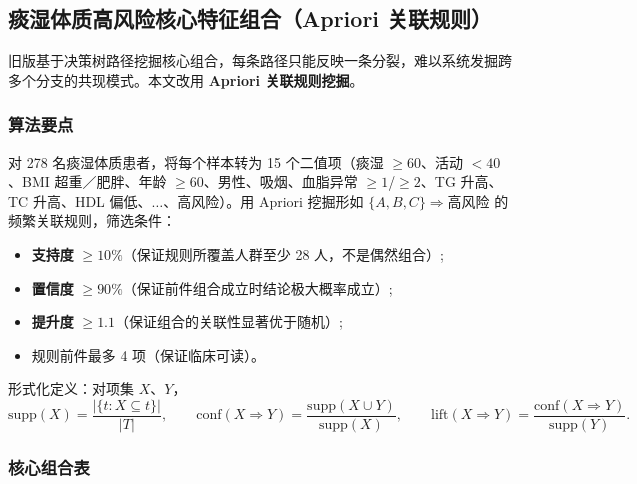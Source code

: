 \documentclass{MathorCupmodeling}
\providecommand{\tightlist}{%
  \setlength{\itemsep}{0pt}\setlength{\parskip}{0pt}}
\begin{document}
\subsection{痰湿体质高风险核心特征组合（Apriori 关联规则）}\label{sec:q2-apriori}

旧版基于决策树路径挖掘核心组合，每条路径只能反映一条分裂，难以系统发掘跨多个分支的共现模式。本文改用 \textbf{Apriori 关联规则挖掘}\cite{agrawal1994}。

\subsubsection{算法要点}

对 278 名痰湿体质患者，将每个样本转为 15 个二值项（痰湿 $\ge 60$、活动 $< 40$、BMI 超重／肥胖、年龄 $\ge 60$、男性、吸烟、血脂异常 $\ge 1$/$\ge 2$、TG 升高、TC 升高、HDL 偏低、$\ldots$、高风险）。用 Apriori 挖掘形如 $\{A, B, C\} \Rightarrow \text{高风险}$ 的频繁关联规则，筛选条件：

\begin{itemize}
\tightlist
\item \textbf{支持度} $\ge 10\%$（保证规则所覆盖人群至少 28 人，不是偶然组合）;
\item \textbf{置信度} $\ge 90\%$（保证前件组合成立时结论极大概率成立）;
\item \textbf{提升度} $\ge 1.1$（保证组合的关联性显著优于随机）;
\item 规则前件最多 4 项（保证临床可读）。
\end{itemize}

形式化定义：对项集 $X$、$Y$，
\[
\text{supp}(X) = \frac{|\{t : X \subseteq t\}|}{|T|}, \qquad
\text{conf}(X \Rightarrow Y) = \frac{\text{supp}(X \cup Y)}{\text{supp}(X)}, \qquad
\text{lift}(X \Rightarrow Y) = \frac{\text{conf}(X \Rightarrow Y)}{\text{supp}(Y)}.
\]

\subsubsection{核心组合表}
\end{document}
